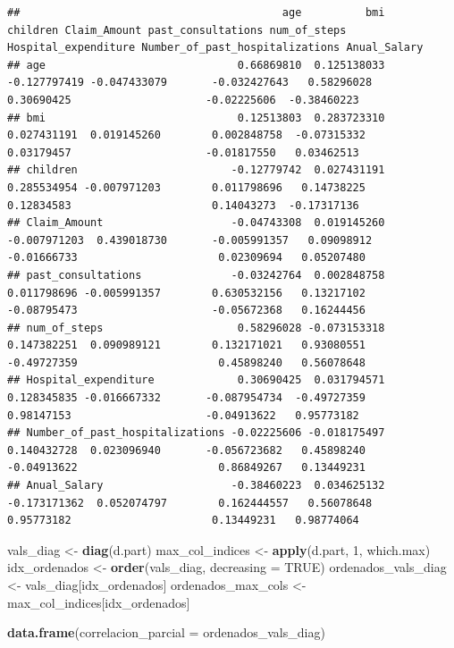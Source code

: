 \documentclass[
]{article}
\newenvironment{Shaded}{\begin{snugshade}}{\end{snugshade}}
\newcommand{\AttributeTok}[1]{\textcolor[rgb]{0.13,0.29,0.53}{#1}}
\newcommand{\ConstantTok}[1]{\textcolor[rgb]{0.56,0.35,0.01}{#1}}
\newcommand{\DecValTok}[1]{\textcolor[rgb]{0.00,0.00,0.81}{#1}}
\newcommand{\FunctionTok}[1]{\textcolor[rgb]{0.13,0.29,0.53}{\textbf{#1}}}
\newcommand{\NormalTok}[1]{#1}
\newcommand{\OtherTok}[1]{\textcolor[rgb]{0.56,0.35,0.01}{#1}}
\begin{document}
\begin{verbatim}
##                                         age          bmi     children Claim_Amount past_consultations num_of_steps Hospital_expenditure Number_of_past_hospitalizations Anual_Salary
## age                              0.66869810  0.125138033 -0.127797419 -0.047433079       -0.032427643   0.58296028           0.30690425                     -0.02225606  -0.38460223
## bmi                              0.12513803  0.283723310  0.027431191  0.019145260        0.002848758  -0.07315332           0.03179457                     -0.01817550   0.03462513
## children                        -0.12779742  0.027431191  0.285534954 -0.007971203        0.011798696   0.14738225           0.12834583                      0.14043273  -0.17317136
## Claim_Amount                    -0.04743308  0.019145260 -0.007971203  0.439018730       -0.005991357   0.09098912          -0.01666733                      0.02309694   0.05207480
## past_consultations              -0.03242764  0.002848758  0.011798696 -0.005991357        0.630532156   0.13217102          -0.08795473                     -0.05672368   0.16244456
## num_of_steps                     0.58296028 -0.073153318  0.147382251  0.090989121        0.132171021   0.93080551          -0.49727359                      0.45898240   0.56078648
## Hospital_expenditure             0.30690425  0.031794571  0.128345835 -0.016667332       -0.087954734  -0.49727359           0.98147153                     -0.04913622   0.95773182
## Number_of_past_hospitalizations -0.02225606 -0.018175497  0.140432728  0.023096940       -0.056723682   0.45898240          -0.04913622                      0.86849267   0.13449231
## Anual_Salary                    -0.38460223  0.034625132 -0.173171362  0.052074797        0.162444557   0.56078648           0.95773182                      0.13449231   0.98774064
\end{verbatim}

\begin{Shaded}
\begin{Highlighting}[]
\NormalTok{vals\_diag }\OtherTok{\textless{}{-}} \FunctionTok{diag}\NormalTok{(d.part)}
\NormalTok{max\_col\_indices }\OtherTok{\textless{}{-}} \FunctionTok{apply}\NormalTok{(d.part, }\DecValTok{1}\NormalTok{, which.max)}
\NormalTok{idx\_ordenados }\OtherTok{\textless{}{-}} \FunctionTok{order}\NormalTok{(vals\_diag, }\AttributeTok{decreasing =} \ConstantTok{TRUE}\NormalTok{)}
\NormalTok{ordenados\_vals\_diag }\OtherTok{\textless{}{-}}\NormalTok{ vals\_diag[idx\_ordenados]}
\NormalTok{ordenados\_max\_cols }\OtherTok{\textless{}{-}}\NormalTok{ max\_col\_indices[idx\_ordenados]}

\FunctionTok{data.frame}\NormalTok{(}\AttributeTok{correlacion\_parcial =}\NormalTok{ ordenados\_vals\_diag)}
\end{Highlighting}
\end{Shaded}
\end{document}
